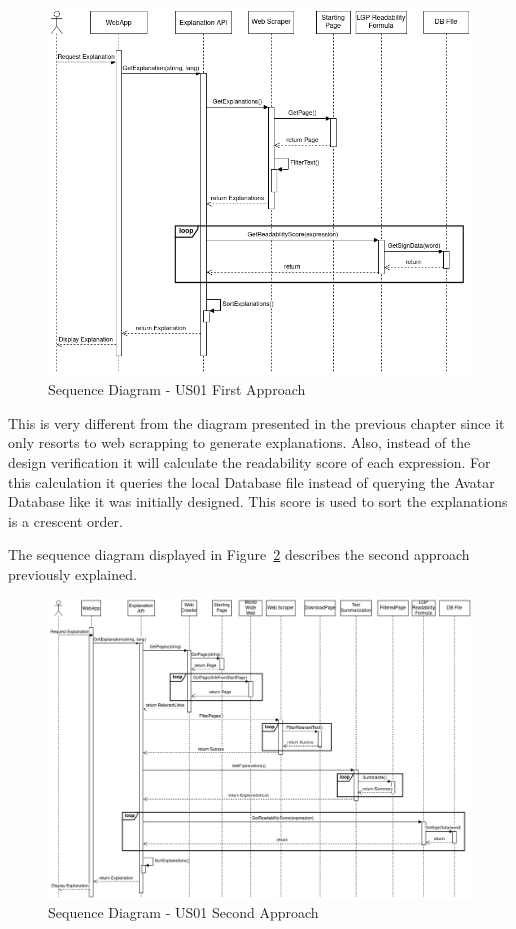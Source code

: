 \begin{figure}[H]
\centering
\includegraphics[scale=0.45]{ch5/assets/US01_SD_Implement_Ap1.png}
\caption[Sequence Diagram US01 First Approach]{Sequence Diagram - US01 First Approach}
\label{fig:uc01Imp1}
\end{figure}

This is very different from the diagram presented in the previous chapter since it only resorts to web scrapping to generate explanations.
Also, instead of the design verification it will calculate the readability score of each expression.
For this calculation it queries the local Database file instead of querying the Avatar Database like it was initially designed.
This score is used to sort the explanations is a crescent order.

The sequence diagram displayed in Figure~\ref{fig:uc01Imp2} describes the second approach previously explained.

\begin{figure}[H]
\centering
\includegraphics[width=\textwidth]{ch5/assets/US01_SD_Implement_Ap2.png}
\caption[Sequence Diagram US01 Second Approach]{Sequence Diagram - US01 Second Approach}
\label{fig:uc01Imp2}
\end{figure}

